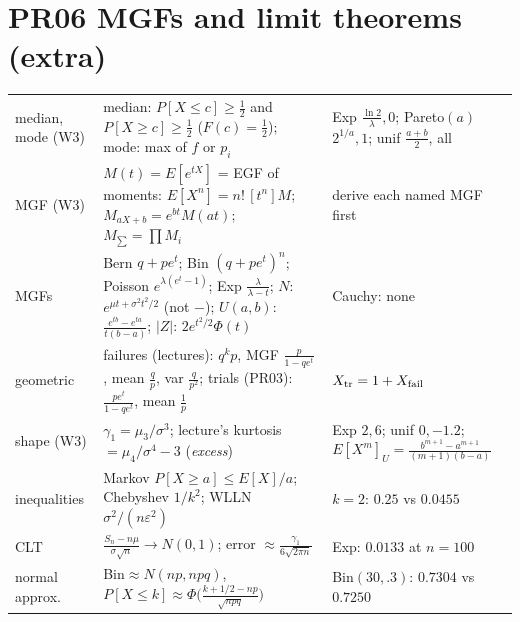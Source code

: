 \documentclass[9pt]{article}
\begin{document}
\section*{PR06 MGFs and limit theorems (extra)}
\begin{tabular}{@{}p{2.9cm}p{8.4cm}p{6.1cm}@{}}
\toprule
median, mode (W3) & median: $P[X{\le}c]\ge\tfrac12$ and $P[X{\ge}c]\ge\tfrac12$ ($F(c)=\tfrac12$); mode: max of $f$ or $p_i$ & Exp $\tfrac{\ln2}\lambda,0$; Pareto$(a)$ $2^{1/a},1$; unif $\tfrac{a+b}2$, all\\
MGF (W3) & $M(t)=E[e^{tX}]$ = EGF of moments: $E[X^n]=n!\,[t^n]M$; $M_{aX+b}=e^{bt}M(at)$; $M_{\sum}=\prod M_i$ & derive each named MGF first\\
MGFs & Bern $q+pe^t$; Bin $(q+pe^t)^n$; Poisson $e^{\lambda(e^t-1)}$; Exp $\tfrac\lambda{\lambda-t}$; $N$: $e^{\mu t+\sigma^2t^2/2}$ (not $-$); $U(a,b)$: $\tfrac{e^{tb}-e^{ta}}{t(b-a)}$; $|Z|$: $2e^{t^2/2}\Phi(t)$ & Cauchy: none\\
geometric & failures (lectures): $q^kp$, MGF $\tfrac p{1-qe^t}$, mean $\tfrac qp$, var $\tfrac q{p^2}$; trials (PR03): $\tfrac{pe^t}{1-qe^t}$, mean $\tfrac1p$ & $X_{\rm tr}=1+X_{\rm fail}$\\
shape (W3) & $\gamma_1=\mu_3/\sigma^3$; lecture's kurtosis $=\mu_4/\sigma^4-3$ (\emph{excess}) & Exp $2,6$; unif $0,-1.2$; $E[X^m]_{U}=\tfrac{b^{m+1}-a^{m+1}}{(m+1)(b-a)}$\\
inequalities & Markov $P[X\ge a]\le E[X]/a$; Chebyshev $1/k^2$; WLLN $\sigma^2/(n\varepsilon^2)$ & $k{=}2$: $0.25$ vs $0.0455$\\
CLT & $\tfrac{S_n-n\mu}{\sigma\sqrt n}\to N(0,1)$; error $\approx\tfrac{\gamma_1}{6\sqrt{2\pi n}}$ & Exp: $0.0133$ at $n{=}100$\\
normal approx. & Bin$\approx N(np,npq)$, $P[X\le k]\approx\Phi\!\big(\tfrac{k+1/2-np}{\sqrt{npq}}\big)$ & Bin$(30,.3)$: $0.7304$ vs $0.7250$\\
\bottomrule
\end{tabular}
\end{document}
